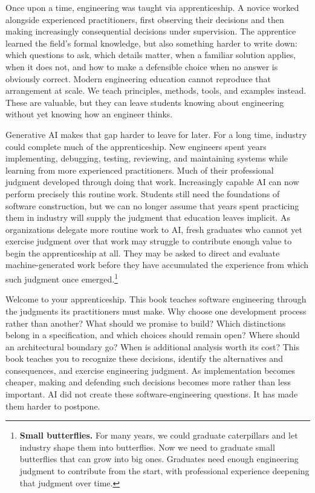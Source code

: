 Once upon a time, engineering was taught via apprenticeship. A novice worked alongside experienced
practitioners, first observing their decisions and then making increasingly consequential decisions
under supervision. The apprentice learned the field's formal knowledge, but also something harder to
write down: which questions to ask, which details matter, when a familiar solution applies, when it
does not, and how to make a defensible choice when no answer is obviously correct. Modern
engineering education cannot reproduce that arrangement at scale. We teach principles, methods,
tools, and examples instead. These are valuable, but they can leave students knowing about
engineering without yet knowing how an engineer thinks.

Generative AI makes that gap harder to leave for later. For a long time, industry could complete
much of the apprenticeship. New engineers spent years implementing, debugging, testing, reviewing,
and maintaining systems while learning from more experienced practitioners. Much of their
professional judgment developed through doing that work. Increasingly capable AI can now perform
precisely this routine work. Students still need the foundations of software construction, but we
can no longer assume that years spent practicing them in industry will supply the judgment that
education leaves implicit. As organizations delegate more routine work to AI, fresh graduates who
cannot yet exercise judgment over that work may struggle to contribute enough value to begin the
apprenticeship at all. They may be asked to direct and evaluate machine-generated work before they
have accumulated the experience from which such judgment once emerged.\footnote{\textbf{Small butterflies.} For many years, we could graduate caterpillars and let
  industry shape them into butterflies. Now we need to graduate small butterflies that can grow into
  big ones. Graduates need enough engineering judgment to contribute from the start, with professional
  experience deepening that judgment over time.}

Welcome to your apprenticeship. This book teaches software engineering through the judgments its
practitioners must make. Why choose one development process rather than another? What should we
promise to build? Which distinctions belong in a specification, and which choices should remain
open? Where should an architectural boundary go? When is additional analysis worth its cost? This
book teaches you to recognize these decisions, identify the alternatives and consequences, and
exercise engineering judgment. As implementation becomes cheaper, making and defending such
decisions becomes more rather than less important. AI did not create these software-engineering
questions. It has made them harder to postpone.

